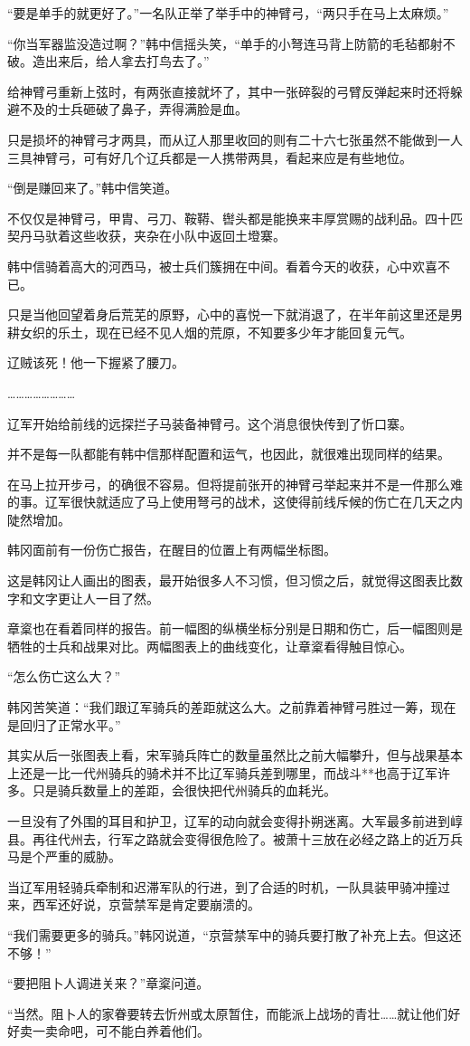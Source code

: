 “要是单手的就更好了。”一名队正举了举手中的神臂弓，“两只手在马上太麻烦。”

“你当军器监没造过啊？”韩中信摇头笑，“单手的小弩连马背上防箭的毛毡都射不破。造出来后，给人拿去打鸟去了。”

给神臂弓重新上弦时，有两张直接就坏了，其中一张碎裂的弓臂反弹起来时还将躲避不及的士兵砸破了鼻子，弄得满脸是血。

只是损坏的神臂弓才两具，而从辽人那里收回的则有二十六七张虽然不能做到一人三具神臂弓，可有好几个辽兵都是一人携带两具，看起来应是有些地位。

“倒是赚回来了。”韩中信笑道。

不仅仅是神臂弓，甲胄、弓刀、鞍鞯、辔头都是能换来丰厚赏赐的战利品。四十匹契丹马驮着这些收获，夹杂在小队中返回土墱寨。

韩中信骑着高大的河西马，被士兵们簇拥在中间。看着今天的收获，心中欢喜不已。

只是当他回望着身后荒芜的原野，心中的喜悦一下就消退了，在半年前这里还是男耕女织的乐土，现在已经不见人烟的荒原，不知要多少年才能回复元气。

辽贼该死！他一下握紧了腰刀。

……………………

辽军开始给前线的远探拦子马装备神臂弓。这个消息很快传到了忻口寨。

并不是每一队都能有韩中信那样配置和运气，也因此，就很难出现同样的结果。

在马上拉开步弓，的确很不容易。但将提前张开的神臂弓举起来并不是一件那么难的事。辽军很快就适应了马上使用弩弓的战术，这使得前线斥候的伤亡在几天之内陡然增加。

韩冈面前有一份伤亡报告，在醒目的位置上有两幅坐标图。

这是韩冈让人画出的图表，最开始很多人不习惯，但习惯之后，就觉得这图表比数字和文字更让人一目了然。

章楶也在看着同样的报告。前一幅图的纵横坐标分别是日期和伤亡，后一幅图则是牺牲的士兵和战果对比。两幅图表上的曲线变化，让章楶看得触目惊心。

“怎么伤亡这么大？”

韩冈苦笑道：“我们跟辽军骑兵的差距就这么大。之前靠着神臂弓胜过一筹，现在是回归了正常水平。”

其实从后一张图表上看，宋军骑兵阵亡的数量虽然比之前大幅攀升，但与战果基本上还是一比一代州骑兵的骑术并不比辽军骑兵差到哪里，而战斗**也高于辽军许多。只是骑兵数量上的差距，会很快把代州骑兵的血耗光。

一旦没有了外围的耳目和护卫，辽军的动向就会变得扑朔迷离。大军最多前进到崞县。再往代州去，行军之路就会变得很危险了。被萧十三放在必经之路上的近万兵马是个严重的威胁。

当辽军用轻骑兵牵制和迟滞军队的行进，到了合适的时机，一队具装甲骑冲撞过来，西军还好说，京营禁军是肯定要崩溃的。

“我们需要更多的骑兵。”韩冈说道，“京营禁军中的骑兵要打散了补充上去。但这还不够！”

“要把阻卜人调进关来？”章楶问道。

“当然。阻卜人的家眷要转去忻州或太原暂住，而能派上战场的青壮……就让他们好好卖一卖命吧，可不能白养着他们。
